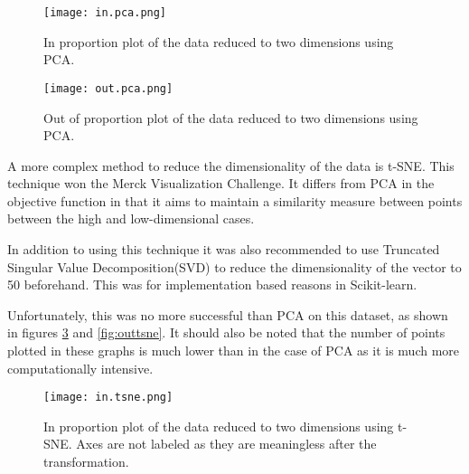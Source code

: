 \begin{figure}
    \centering
    \texttt{[image: in.pca.png]}
    \caption{In proportion plot of the data reduced to two dimensions using PCA.}
    \label{fig:inpca}
\end{figure}

\begin{figure}
    \texttt{[image: out.pca.png]}
    \centering
    \caption{Out of proportion plot of the data reduced to two dimensions using PCA.}
    \label{fig:outpca}
\end{figure}


A more complex method to reduce the dimensionality of the data is t-SNE\autocite{van_der_maaten_visualizing_2008}.
This technique won the Merck Visualization Challenge.
It differs from PCA in the objective function in that it aims to maintain a similarity measure between points between the high and low-dimensional cases.

In addition to using this technique it was also recommended to use Truncated Singular Value Decomposition(SVD) to reduce the dimensionality of the vector to 50 beforehand.
This was for implementation based reasons in Scikit-learn.

Unfortunately, this was no more successful than PCA on this dataset, as shown in figures \ref{fig:intsne} and \ref{fig:outtsne}.
It should also be noted that the number of points plotted in these graphs is much lower than in the case of PCA as it is much more computationally intensive.

\begin{figure}
    \texttt{[image: in.tsne.png]}
    \centering
    \caption{In proportion plot of the data reduced to two dimensions using t-SNE. Axes are not labeled as they are meaningless after the transformation.}
    \label{fig:intsne}
\end{figure}

